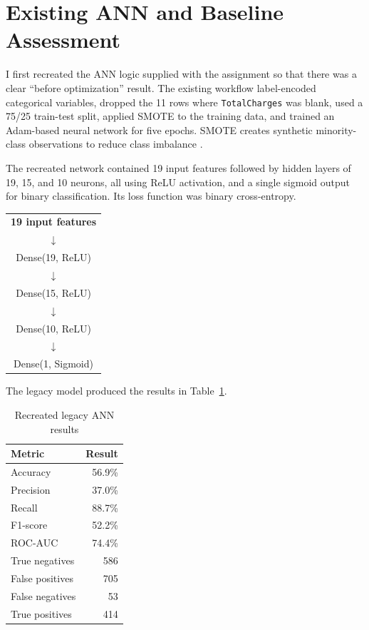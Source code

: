 \documentclass[11pt]{article}
\begin{document}
\section{Existing ANN and Baseline Assessment}

I first recreated the ANN logic supplied with the assignment so that there was a clear ``before optimization'' result. The existing workflow label-encoded categorical variables, dropped the 11 rows where \texttt{TotalCharges} was blank, used a 75/25 train-test split, applied SMOTE to the training data, and trained an Adam-based neural network for five epochs. SMOTE creates synthetic minority-class observations to reduce class imbalance \citep{chawla2002}.

The recreated network contained 19 input features followed by hidden layers of 19, 15, and 10 neurons, all using ReLU activation, and a single sigmoid output for binary classification. Its loss function was binary cross-entropy.

\begin{center}
\begin{tabular}{c}
\textbf{19 input features}\\
$\downarrow$\\
Dense(19, ReLU)\\
$\downarrow$\\
Dense(15, ReLU)\\
$\downarrow$\\
Dense(10, ReLU)\\
$\downarrow$\\
Dense(1, Sigmoid)
\end{tabular}
\end{center}

The legacy model produced the results in Table~\ref{tab:legacy}.

\begin{table}[H]
\centering
\caption{Recreated legacy ANN results}
\label{tab:legacy}
\begin{tabular}{lr}
\toprule
\textbf{Metric} & \textbf{Result}\\
\midrule
Accuracy & 56.9\%\\
Precision & 37.0\%\\
Recall & 88.7\%\\
F1-score & 52.2\%\\
ROC-AUC & 74.4\%\\
True negatives & 586\\
False positives & 705\\
False negatives & 53\\
True positives & 414\\
\bottomrule
\end{tabular}
\end{table}
\end{document}
